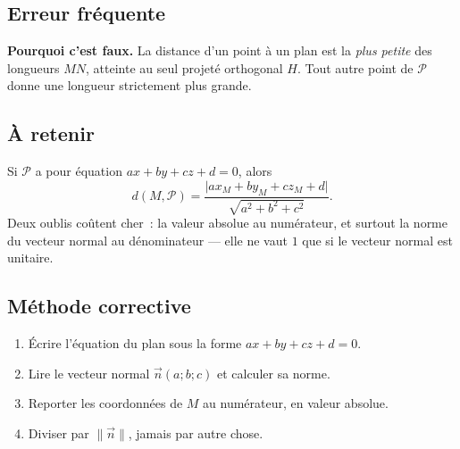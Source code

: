 

\subsection*{Erreur fréquente}


\textbf{Pourquoi c'est faux.} La distance d'un point à un plan est la
\emph{plus petite} des longueurs $MN$, atteinte au seul projeté orthogonal
$H$. Tout autre point de $\mathcal{P}$ donne une longueur strictement plus
grande.

\subsection*{À retenir}

Si $\mathcal{P}$ a pour équation $ax+by+cz+d=0$, alors
\[
  d(M,\mathcal{P})=\frac{\lvert a x_M + b y_M + c z_M + d\rvert}
                        {\sqrt{a^2+b^2+c^2}}.
\]
Deux oublis coûtent cher~: la valeur absolue au numérateur, et surtout la
norme du vecteur normal au dénominateur --- elle ne vaut $1$ que si le vecteur
normal est unitaire.

\subsection*{Méthode corrective}

\begin{enumerate}
  \item Écrire l'équation du plan sous la forme $ax+by+cz+d=0$.
  \item Lire le vecteur normal $\vec{n}(a;b;c)$ et calculer sa norme.
  \item Reporter les coordonnées de $M$ au numérateur, en valeur absolue.
  \item Diviser par $\lVert\vec{n}\rVert$, jamais par autre chose.
\end{enumerate}

